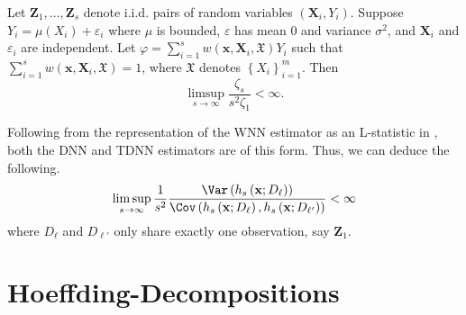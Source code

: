 \begin{thm}
	Let $\mathbf{Z}_1, \ldots, \mathbf{Z}_s$ denote i.i.d. pairs of random variables $\left(\mathbf{X}_i, Y_i\right)$.
	Suppose $Y_i=\mu\left(X_i\right)+\varepsilon_i$ where $\mu$ is bounded, $\varepsilon$ has mean 0 and variance $\sigma^2$, and $\mathbf{X}_i$ and $\varepsilon_i$ are independent.
	Let $\varphi=\sum_{i=1}^s w(\mathbf{x}, \mathbf{X}_i, \mathfrak{X}) Y_i$ such that $\sum_{i=1}^s w(\mathbf{x}, \mathbf{X}_i, \mathfrak{X})=1$, where $\mathfrak{X}$ denotes $\left\{X_i\right\}_{i=1}^m$.
	Then
	\begin{equation}
		\limsup _{s \rightarrow \infty} \frac{\zeta_s}{s^2 \zeta_1}
		< \infty.
	\end{equation}
\end{thm}

Following from the representation of the WNN estimator as an L-statistic in \citet{steele_exact_2009}, both the DNN and TDNN estimators are of this form.
Thus, we can deduce the following.
\begin{equation}
	\limsup _{s \rightarrow \infty} \frac{1}{s^2} \frac{\Var\left(h_{s}\left(\mathbf{x}; D_{\ell}\right)\right)}{\Cov\left(h_s\left(\mathbf{x}; D_{\ell}\right), h_s\left(\mathbf{x}; D_{\ell'}\right)\right)}
	< \infty
\end{equation}
where $D_{\ell}$ and $D_{\ell'}$ only share exactly one observation, say $\mathbf{Z}_1$.

\section{Hoeffding-Decompositions}

